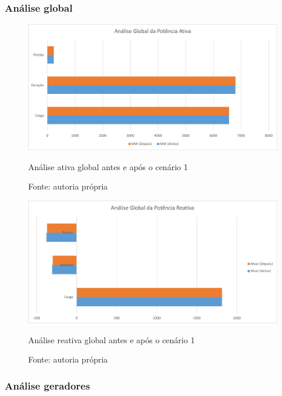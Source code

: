 \subsubsection{Análise global}


\begin{figure}[H]
	\centering
	\captionsetup{width=\textwidth, font=footnotesize, textfont=bf}	
	\includegraphics[width=\linewidth]{img/global_MW_caso1.pdf}
	\caption{Análise ativa global antes e após o cenário 1}
	\vspace{-3.5mm}
	\caption*{Fonte: autoria própria}
	\label{fig:global_MW_caso1}
\end{figure}

\begin{figure}[H]
	\centering
	\captionsetup{width=\textwidth, font=footnotesize, textfont=bf}	
	\includegraphics[width=\linewidth]{img/global_MVAr_caso1.pdf}
	\caption{Análise reativa global antes e após o cenário 1}
	\vspace{-3.5mm}
	\caption*{Fonte: autoria própria}
	\label{fig:global_MVAr_caso1}
\end{figure}
\subsubsection{Análise geradores}


